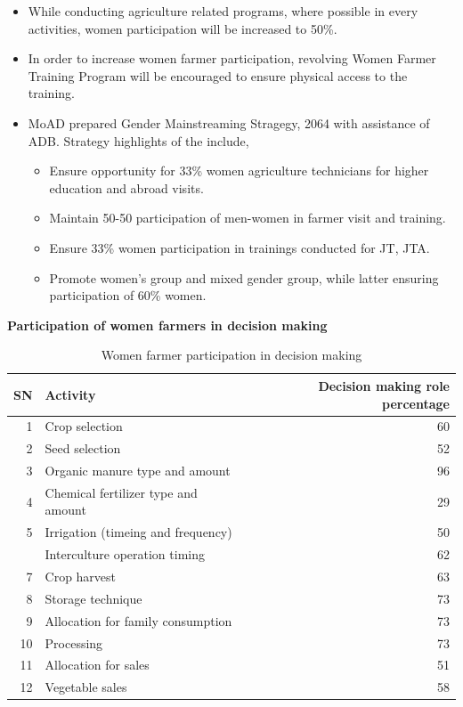 \documentclass[
  openany]{book}
\providecommand{\tightlist}{%
  \setlength{\itemsep}{0pt}\setlength{\parskip}{0pt}}
\begin{document}
\begin{itemize}
\tightlist
\item
  While conducting agriculture related programs, where possible in every activities, women participation will be increased to 50\%.
\item
  In order to increase women farmer participation, revolving Women Farmer Training Program will be encouraged to ensure physical access to the training.
\item
  MoAD prepared Gender Mainstreaming Stragegy, 2064 with assistance of ADB. Strategy highlights of the include,

  \begin{itemize}
  \tightlist
  \item
    Ensure opportunity for 33\% women agriculture technicians for higher education and abroad visits.
  \item
    Maintain 50-50 participation of men-women in farmer visit and training.
  \item
    Ensure 33\% women participation in trainings conducted for JT, JTA.
  \item
    Promote women's group and mixed gender group, while latter ensuring participation of 60\% women.
  \end{itemize}
\end{itemize}

\textbf{Participation of women farmers in decision making}

\begin{table}[!h]

\caption{\label{tab:women-farmer-participation}Women farmer participation in decision making}
\centering
\begin{tabular}[t]{rlr}
\toprule
SN & Activity & Decision making role percentage\\
\midrule
\rowcolor{gray!6}  1 & Crop selection & 60\\
2 & Seed selection & 52\\
\rowcolor{gray!6}  3 & Organic manure type and amount & 96\\
4 & Chemical fertilizer type and amount & 29\\
\rowcolor{gray!6}  5 & Irrigation (timeing and frequency) & 50\\
\addlinespace
6 & Interculture operation timing & 62\\
\rowcolor{gray!6}  7 & Crop harvest & 63\\
8 & Storage technique & 73\\
\rowcolor{gray!6}  9 & Allocation for family consumption & 73\\
10 & Processing & 73\\
\addlinespace
\rowcolor{gray!6}  11 & Allocation for sales & 51\\
12 & Vegetable sales & 58\\
\bottomrule
\end{tabular}
\end{table}
\end{document}
